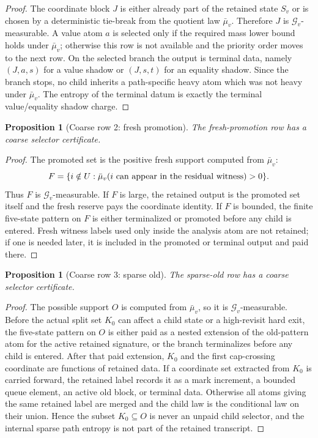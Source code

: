 \documentclass[11pt]{article}
\newtheorem{proposition}[theorem]{Proposition}
\theoremstyle{remark}
\newcommand{\G}{\mathcal G}
\begin{document}
\begin{proof}
The coordinate block $J$ is either already part of the retained state $S_v$ or is chosen by a deterministic tie-break from the quotient law $\bar\mu_v$.  Therefore $J$ is $\G_v$-measurable.  A value atom $a$ is selected only if the required mass lower bound holds under $\bar\mu_v$; otherwise this row is not available and the priority order moves to the next row.  On the selected branch the output is terminal data, namely $(J,a,s)$ for a value shadow or $(J,s,t)$ for an equality shadow.  Since the branch stops, no child inherits a path-specific heavy atom which was not heavy under $\bar\mu_v$.  The entropy of the terminal datum is exactly the terminal value/equality shadow charge.
\end{proof}

\begin{proposition}[Coarse row 2: fresh promotion]\label{prop:coarse-row-fresh}
The fresh-promotion row has a coarse selector certificate.
\end{proposition}

\begin{proof}
The promoted set is the positive fresh support computed from $\bar\mu_v$:
\[
        F=\{i\notin U:\bar\mu_v(i\hbox{ can appear in the residual witness})>0\}.
\]
Thus $F$ is $\G_v$-measurable.  If $F$ is large, the retained output is the promoted set itself and the fresh reserve pays the coordinate identity.  If $F$ is bounded, the finite five-state pattern on $F$ is either terminalized or promoted before any child is entered.  Fresh witness labels used only inside the analysis atom are not retained; if one is needed later, it is included in the promoted or terminal output and paid there.
\end{proof}

\begin{proposition}[Coarse row 3: sparse old]\label{prop:coarse-row-sparse-old}
The sparse-old row has a coarse selector certificate.
\end{proposition}

\begin{proof}
The possible support $O$ is computed from $\bar\mu_v$, so it is $\G_v$-measurable.  Before the actual split set $K_0$ can affect a child state or a high-revisit hard exit, the five-state pattern on $O$ is either paid as a nested extension of the old-pattern atom for the active retained signature, or the branch terminalizes before any child is entered.  After that paid extension, $K_0$ and the first cap-crossing coordinate are functions of retained data.  If a coordinate set extracted from $K_0$ is carried forward, the retained label records it as a mark increment, a bounded queue element, an active old block, or terminal data.  Otherwise all atoms giving the same retained label are merged and the child law is the conditional law on their union.  Hence the subset $K_0\subseteq O$ is never an unpaid child selector, and the internal sparse path entropy is not part of the retained transcript.
\end{proof}
\end{document}
